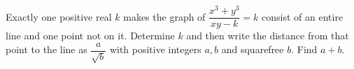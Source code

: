 Exactly one positive real $k$ makes the graph of $\dfrac{x^3+y^3}{xy-k}=k$ consist of an entire line and one point not on it. Determine $k$ and then write the distance from that point to the line as $\dfrac{a}{\sqrt b}$ with positive integers $a,b$ and squarefree $b$. Find $a+b$.
